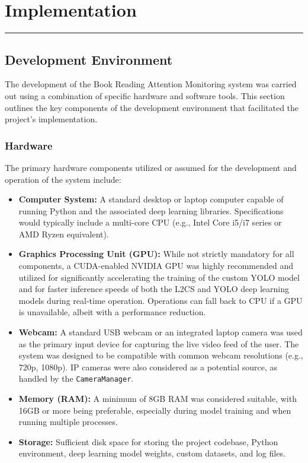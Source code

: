\chapter{Implementation}
\vspace{-1.5cm}
\hspace{-1cm}\rule{19cm}{0.4pt} 

\section{Development Environment}
The development of the Book Reading Attention Monitoring system was carried out using a combination of specific hardware and software tools. This section outlines the key components of the development environment that facilitated the project's implementation.

\subsection{Hardware}
The primary hardware components utilized or assumed for the development and operation of the system include:
\begin{itemize}
    \item \textbf{Computer System:} A standard desktop or laptop computer capable of running Python and the associated deep learning libraries. Specifications would typically include a multi-core CPU (e.g., Intel Core i5/i7 series or AMD Ryzen equivalent).
    \item \textbf{Graphics Processing Unit (GPU):} While not strictly mandatory for all components, a CUDA-enabled NVIDIA GPU was highly recommended and utilized for significantly accelerating the training of the custom YOLO model and for faster inference speeds of both the L2CS and YOLO deep learning models during real-time operation. Operations can fall back to CPU if a GPU is unavailable, albeit with a performance reduction.
    \item \textbf{Webcam:} A standard USB webcam or an integrated laptop camera was used as the primary input device for capturing the live video feed of the user. The system was designed to be compatible with common webcam resolutions (e.g., 720p, 1080p). IP cameras were also considered as a potential source, as handled by the \texttt{CameraManager}.
    \item \textbf{Memory (RAM):} A minimum of 8GB RAM was considered suitable, with 16GB or more being preferable, especially during model training and when running multiple processes.
    \item \textbf{Storage:} Sufficient disk space for storing the project codebase, Python environment, deep learning model weights, custom datasets, and log files.
\end{itemize}


